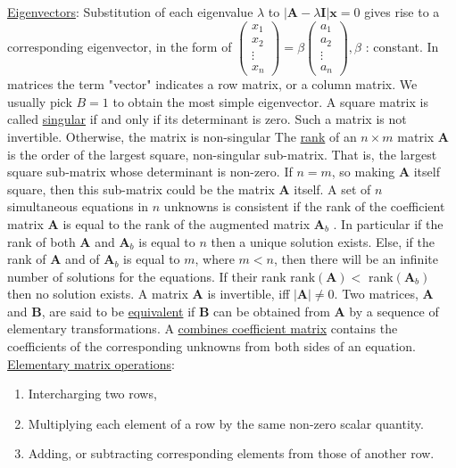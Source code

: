 \documentclass[12pt]{article}
\begin{document}
\begin{flushleft}
	\textbullet \quad \uline{Eigenvectors}: Substitution of each eigenvalue $\lambda$ to $\left| \textbf{A} - \lambda \textbf{I} \right| \textbf{x} = 0$ gives rise to a corresponding eigenvector, in the form of $\begin{pmatrix}
	x_1 \\ x_2 \\ \vdots \\ x_n
	\end{pmatrix} = \beta 
	\begin{pmatrix}
	a_1 \\ a_2 \\ \vdots \\ a_n
	\end{pmatrix}, \beta$  :  constant. In matrices the term "vector" indicates a row matrix, or a column matrix. We usually pick $B = 1$ to obtain the most simple eigenvector. 
	\textbullet \quad A square matrix is called \uline{singular} if and only if its determinant is zero. Such a matrix is not invertible. Otherwise, the matrix is non-singular \linebreak 
	\textbullet \quad The \uline{rank} of an $n \times m$ matrix $\textbf{A}$ is the order of the largest square, non-singular sub-matrix. That is, the largest square sub-matrix whose determinant is non-zero. If $n=m$, so making $\textbf{A}$ itself square, then this sub-matrix could be the matrix $\textbf{A}$ itself. \linebreak 
	\textbullet \quad A set of $n$ simultaneous equations in $n$ unknowns is consistent if the rank of the coefficient matrix $\textbf{A}$ is equal to the rank of the augmented matrix $\textbf{A}_b$ . In particular if the rank of both $\textbf{A}$ and $\textbf{A}_b$ is equal to $n$ then a unique solution exists. Else, if the rank of $\textbf{A}$ and of $\textbf{A}_b$ is equal to $m$, where $m<n$, then there will be an infinite number of solutions for the equations. If their rank rank$(\textbf{A}) <$ rank$(\textbf{A}_b)$ then no solution exists. \linebreak 
	\textbullet \quad A matrix $\textbf{A}$ is invertible, iff $|\textbf{A}| \neq 0$. \linebreak 
	\textbullet \quad Two matrices, $\textbf{A}$ and $\textbf{B}$, are said to be \uline{equivalent} if $\textbf{B}$ can be obtained from $\textbf{A}$ by a sequence of elementary transformations. \linebreak 
	\textbullet \quad  A \uline{combines coefficient matrix} contains the coefficients of the corresponding unknowns from both sides of an equation. \linebreak 
	\textbullet \quad \uline{Elementary matrix operations}:  
	\begin{enumerate}
	\item Intercharging two rows, 
	\item Multiplying each element of a row by the same non-zero scalar quantity. 
	\item Adding, or subtracting corresponding elements from those of another row. 
	\end{enumerate} 
	

\end{flushleft}
\end{document}
